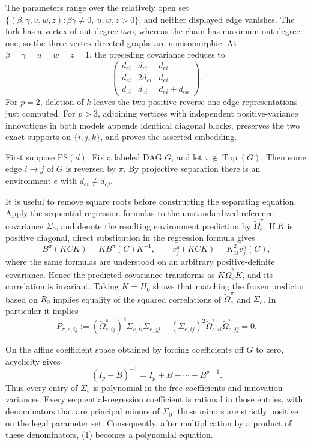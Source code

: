 The parameters range over the relatively open set
\(\{(\beta,\gamma,u,w,z):\beta\gamma\ne0,\ u,w,z>0\}\), and neither displayed edge vanishes.  The fork has a vertex of out-degree two, whereas the chain has maximum out-degree one, so the three-vertex directed graphs are nonisomorphic.  At \(\beta=\gamma=u=w=z=1\), the preceding covariance reduces to
\[
 \begin{pmatrix}
 d_{ei}&d_{ei}&d_{ei}\\
 d_{ei}&2d_{ei}&d_{ei}\\
 d_{ei}&d_{ei}&d_{ei}+d_{ek}
 \end{pmatrix}.
\]
For \(p=2\), deletion of \(k\) leaves the two positive reverse one-edge representations just computed.  For \(p>3\), adjoining vertices with independent positive-variance innovations in both models appends identical diagonal blocks, preserves the two exact supports on \(\{i,j,k\}\), and proves the asserted embedding.

First suppose \(\mathrm{PS}(d)\).  Fix a labeled DAG \(G\), and let \(\pi\notin\operatorname{Top}(G)\).  Then some edge \(i\to j\) of \(G\) is reversed by \(\pi\).  By projective separation there is an environment \(e\) with \(d_{ei}\ne d_{ej}\).

It is useful to remove square roots before constructing the separating equation.  Apply the sequential-regression formulas to the unstandardized reference covariance \(\Sigma_0\), and denote the resulting environment prediction by \(\widetilde\Omega_e^\pi\).  If \(K\) is positive diagonal, direct substitution in the regression formula gives
\[
 B^\pi(KCK) = KB^\pi(C)K^{-1},\qquad
 v_j^\pi(KCK)=K_{jj}^2v_j^\pi(C),
\]
where the same formulas are understood on an arbitrary positive-definite covariance.  Hence the predicted covariance transforms as \(K\widetilde\Omega_e^\pi K\), and its correlation is invariant.  Taking \(K=H_0\) shows that matching the frozen predictor based on \(R_0\) implies equality of the squared correlations of \(\widetilde\Omega_e^\pi\) and \(\Sigma_e\).  In particular it implies
\[
 P_{\pi,e,ij}:=
 (\widetilde\Omega_{e,ij}^\pi)^2\Sigma_{e,ii}\Sigma_{e,jj}
 -(\Sigma_{e,ij})^2\widetilde\Omega_{e,ii}^\pi
 \widetilde\Omega_{e,jj}^\pi=0. \tag{1}
\]

On the affine coefficient space obtained by forcing coefficients off \(G\) to zero, acyclicity gives
\[
 (I_p-B)^{-1}=I_p+B+\cdots+B^{p-1}.
\]
Thus every entry of \(\Sigma_e\) is polynomial in the free coefficients and innovation variances.  Every sequential-regression coefficient is rational in those entries, with denominators that are principal minors of \(\Sigma_0\); those minors are strictly positive on the legal parameter set.  Consequently, after multiplication by a product of these denominators, (1) becomes a polynomial equation.

